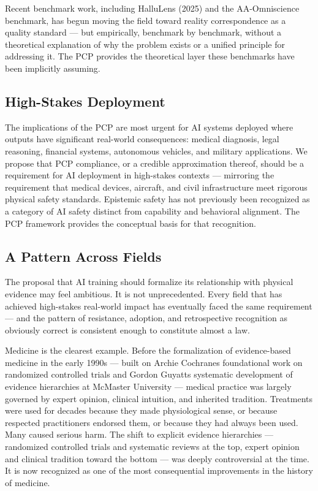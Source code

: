 \documentclass[12pt]{article}
\begin{document}
Recent benchmark work, including HalluLens (2025) and the AA-Omniscience
benchmark, has begun moving the field toward reality correspondence as a
quality standard --- but empirically, benchmark by benchmark, without a
theoretical explanation of why the problem exists or a unified principle
for addressing it. The PCP provides the theoretical layer these
benchmarks have been implicitly assuming.

\subsection{High-Stakes Deployment}\label{high-stakes-deployment}

The implications of the PCP are most urgent for AI systems deployed
where outputs have significant real-world consequences: medical
diagnosis, legal reasoning, financial systems, autonomous vehicles, and
military applications. We propose that PCP compliance, or a credible
approximation thereof, should be a requirement for AI deployment in
high-stakes contexts --- mirroring the requirement that medical devices,
aircraft, and civil infrastructure meet rigorous physical safety
standards. Epistemic safety has not previously been recognized as a
category of AI safety distinct from capability and behavioral alignment.
The PCP framework provides the conceptual basis for that recognition.

\subsection{A Pattern Across Fields}\label{a-pattern-across-fields}

The proposal that AI training should formalize its relationship with
physical evidence may feel ambitious. It is not unprecedented. Every
field that has achieved high-stakes real-world impact has eventually
faced the same requirement --- and the pattern of resistance, adoption,
and retrospective recognition as obviously correct is consistent enough
to constitute almost a law.

Medicine is the clearest example. Before the formalization of
evidence-based medicine in the early 1990s --- built on Archie
Cochrane\textquotesingle s foundational work on randomized controlled
trials and Gordon Guyatt\textquotesingle s systematic development of
evidence hierarchies at McMaster University --- medical practice was
largely governed by expert opinion, clinical intuition, and inherited
tradition. Treatments were used for decades because they made
physiological sense, or because respected practitioners endorsed them,
or because they had always been used. Many caused serious harm. The
shift to explicit evidence hierarchies --- randomized controlled trials
and systematic reviews at the top, expert opinion and clinical tradition
toward the bottom --- was deeply controversial at the time. It is now
recognized as one of the most consequential improvements in the history
of medicine.
\end{document}
